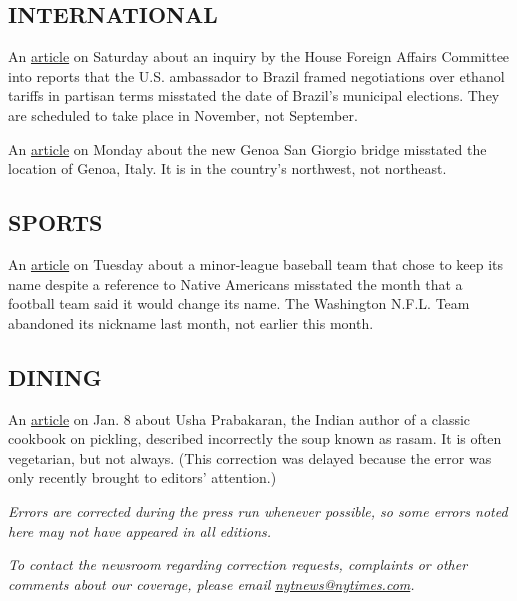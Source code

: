 \hypertarget{international}{%
\subsection{INTERNATIONAL}\label{international}}

An
\href{https://www.nytimes.com/2020/07/31/world/americas/brazil-trump-ethanol-chapman.html}{article}
on Saturday about an inquiry by the House Foreign Affairs Committee into
reports that the U.S. ambassador to Brazil framed negotiations over
ethanol tariffs in partisan terms misstated the date of Brazil's
municipal elections. They are scheduled to take place in November, not
September.

An
\href{https://www.nytimes.com/2020/08/02/world/europe/genoa-Morandi-bridge-replacement.html}{article}
on Monday about the new Genoa San Giorgio bridge misstated the location
of Genoa, Italy. It is in the country's northwest, not northeast.

\hypertarget{sports}{%
\subsection{SPORTS}\label{sports}}

An
\href{https://www.nytimes.com/2020/08/03/sports/baseball/indians-team-names-mascots.html}{article}
on Tuesday about a minor-league baseball team that chose to keep its
name despite a reference to Native Americans misstated the month that a
football team said it would change its name. The Washington N.F.L. Team
abandoned its nickname last month, not earlier this month.

\hypertarget{dining}{%
\subsection{DINING}\label{dining}}

An
\href{https://www.nytimes.com/2020/01/06/dining/indian-pickle-queen-usha-prabakaran.html}{article}
on Jan. 8 about Usha Prabakaran, the Indian author of a classic cookbook
on pickling, described incorrectly the soup known as rasam. It is often
vegetarian, but not always. (This correction was delayed because the
error was only recently brought to editors' attention.)

\emph{Errors are corrected during the press run whenever possible, so
some errors noted here may not have appeared in all editions.}

\emph{To contact the newsroom regarding correction requests, complaints
or other comments about our coverage, please email}
\href{mailto:nytnews@nytimes.com}{\emph{nytnews@nytimes.com}}\emph{.}

